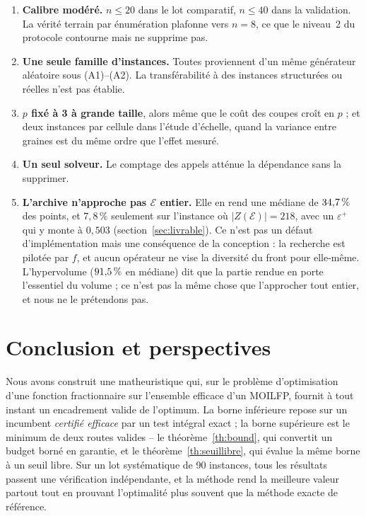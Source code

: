 \documentclass[11pt,a4paper]{article}
\theoremstyle{plain}
\theoremstyle{remark}
\newcommand{\Ecal}{\mathcal{E}}
\begin{document}
\begin{enumerate}[leftmargin=*,itemsep=3pt]
      Une seconde difficulté, indépendante, est de \emph{classe} : la
      section~\ref{sec:position} montre que~\cite{drici2018} traite des
      critères linéaires. La comparaison ne pourra donc porter que sur
      l'intersection des deux classes, et n'établira rien sur le régime à
      critères fractionnaires -- celui qui nous occupe.
\item \textbf{Calibre modéré.} $n\le 20$ dans le lot comparatif, $n\le 40$
      dans la validation. La vérité terrain par énumération plafonne vers
      $n=8$, ce que le niveau~2 du protocole contourne mais ne supprime pas.
\item \textbf{Une seule famille d'instances.} Toutes proviennent d'un même
      générateur aléatoire sous (A1)--(A2). La transférabilité à des
      instances structurées ou réelles n'est pas établie.
\item \textbf{$p$ fixé à 3 à grande taille}, alors même que le coût des
      coupes croît en $p$ ; et deux instances par cellule dans l'étude
      d'échelle, quand la variance entre graines est du même ordre que
      l'effet mesuré.
\item \textbf{Un seul solveur.} Le comptage des appels atténue la dépendance
      sans la supprimer.
\item \textbf{L'archive n'approche pas $\Ecal$ entier.} Elle en rend une
      médiane de $34{,}7{}\,\%$ des points, et $7{,}8\,\%$ seulement sur
      l'instance où $|Z(\Ecal)|=218$, avec un $\varepsilon^+$ qui y monte à
      $0{,}503$ (section~\ref{sec:livrable}). Ce n'est pas un défaut
      d'implémentation mais une conséquence de la conception : la recherche
      est pilotée par $f$, et aucun opérateur ne vise la diversité du front
      pour elle-même. L'hypervolume ($91{,}5{}\,\%$ en médiane) dit que la
      partie rendue en porte l'essentiel du volume ; ce n'est pas la même
      chose que l'approcher tout entier, et nous ne le prétendons pas.
\end{enumerate}

\section{Conclusion et perspectives}

Nous avons construit une matheuristique qui, sur le problème d'optimisation
d'une fonction fractionnaire sur l'ensemble efficace d'un MOILFP, fournit à
tout instant un encadrement valide de l'optimum. La borne inférieure repose
sur un incumbent \emph{certifié efficace} par un test intégral exact ; la
borne supérieure est le minimum de deux routes valides -- le
théorème~\ref{th:bound}, qui convertit un budget borné en garantie, et le
théorème~\ref{th:seuillibre}, qui évalue la même borne à un seuil libre. Sur
un lot systématique de 90 instances, tous les résultats passent une
vérification indépendante, et la méthode rend la meilleure valeur partout
tout en prouvant l'optimalité plus souvent que la méthode exacte de
référence.
\end{document}
